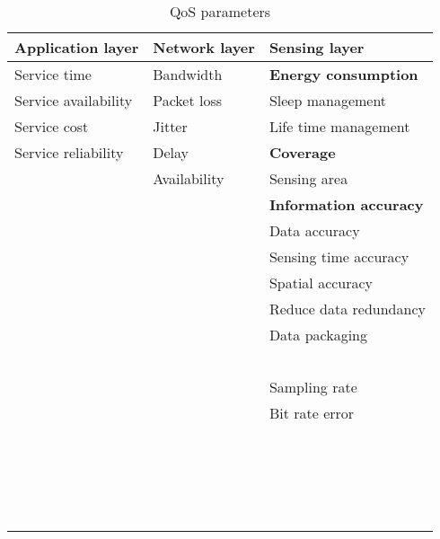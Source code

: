 \begin{table}[h!]
	\begin{tabulary}{\textwidth}{L|L|L}
	\textbf{Application layer} & \textbf{Network layer} & \textbf{Sensing layer }        \\\hline
	Service time               & Bandwidth              & \textbf{Energy consumption}                  \\
	Service availability       & Packet loss            & Sleep management          \\
	Service cost               & Jitter                 & Life time management                  \\
	Service reliability        & Delay                  & \textbf{Coverage}                   \\
	\                          & Availability           & Sensing area              \\
	\                          &                        & \textbf{Information accuracy}  \\
	\                          &                        & Data accuracy                  \\
	\                          &                        & Sensing time accuracy          \\
	\                          &                        & Spatial accuracy               \\
	\                          &                        & Reduce data redundancy         \\
	\                          &                        & Data packaging                 \\
	\                          &                        &                                \\\hline
	\                          &                        & Sampling rate                               \\\hline
	\                          &                        & Bit rate error                               \\\hline
	\                          &                        &                                \\\hline
	\                          &                        &                                \\\hline
	\                          &                        &                                \\\hline
	\                          &                        &                                \\\hline

	\end{tabulary}
\caption{\label{tab:} QoS parameters \cite{meshinchi_qosaware_2018} \cite{chowdhury_survey_2018}}
\end{table}

